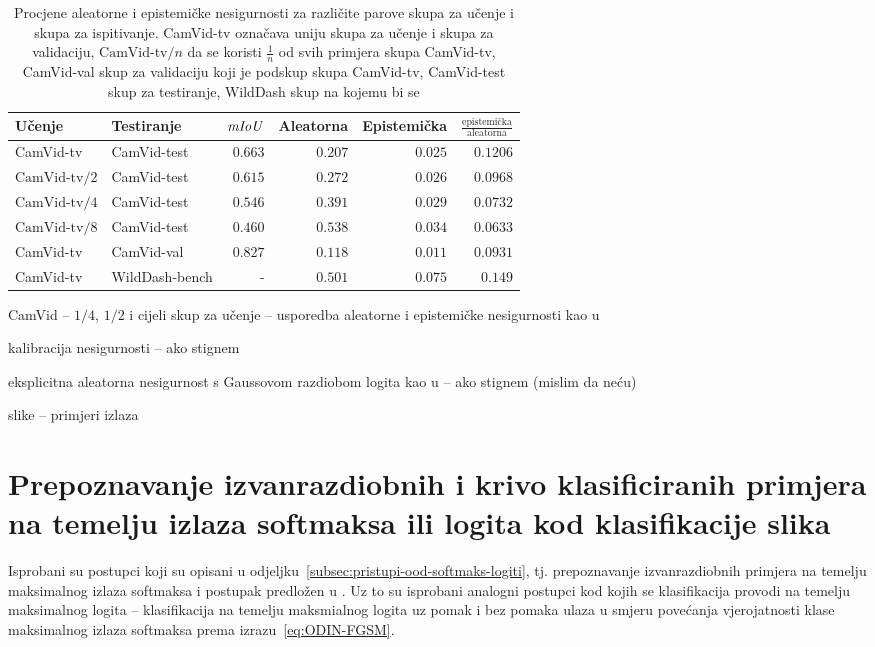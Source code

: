 \documentclass[utf8, diplomski, lmodern]{fer}
\begin{document}
\begin{table}
	\centering\small
	\begin{tabular}{llrrrr}
		\toprule
		\bfseries Učenje & \bfseries Testiranje & $\mathit{mIoU}$ & \bfseries Aleatorna & \bfseries Epistemička & $\frac{\text{epistemička}}{\text{aleatorna}}$ \\
		\midrule
		CamVid-tv & CamVid-test & $0.663$ & $0.207$ & $0.025$ & $0.1206$ \\
		$\text{CamVid-tv}/2$ & CamVid-test & $0.615$ & $0.272$ & $0.026$ & $0.0968$ \\
		$\text{CamVid-tv}/4$ & CamVid-test & $0.546$ & $0.391$ & $0.029$ & $0.0732$ \\
		$\text{CamVid-tv}/8$ & CamVid-test & $0.460$ & $0.538$ & $0.034$ & $0.0633$ \\
		\midrule
		CamVid-tv     & CamVid-val  & $0.827$ & $0.118$ & $0.011$ & $0.0931$ \\
		\midrule
		CamVid-tv    & WildDash-bench &      -  & $0.501$ & $0.075$ & $0.149$ \\
		\bottomrule
	\end{tabular}
	\caption{Procjene aleatorne i epistemičke nesigurnosti za različite parove skupa za učenje i skupa za ispitivanje. CamVid-tv označava uniju skupa za učenje i skupa za validaciju, $\text{CamVid-tv}/n$ da se koristi $\frac{1}{n}$ od svih primjera skupa CamVid-tv, CamVid-val skup za validaciju koji je podskup skupa CamVid-tv, CamVid-test skup za testiranje, WildDash skup na kojemu bi se}
	\label{tab:epistemicka-aleatorna-ucenje-testiranje}
\end{table}


CamVid -- $1/4$, $1/2$ i cijeli skup za učenje -- usporedba aleatorne i epistemičke nesigurnosti kao u \cite{Smith:2018:UMUAED}

kalibracija nesigurnosti -- ako stignem

eksplicitna aleatorna nesigurnost s Gaussovom razdiobom logita kao u \cite{Kendall:2017:WUNBDLCV} -- ako stignem (mislim da neću)

slike -- primjeri izlaza

\section{Prepoznavanje izvanrazdiobnih i krivo klasificiranih primjera na temelju izlaza softmaksa ili logita kod klasifikacije slika}

Isprobani su postupci koji su opisani u odjeljku~\ref{subsec:pristupi-ood-softmaks-logiti}, tj. prepoznavanje izvanrazdiobnih primjera na temelju maksimalnog izlaza softmaksa \citep{Hendrycks:2016:BDMOODE} i postupak predložen u \cite{Liang:2017:PDOODENN}. Uz to su isprobani analogni postupci kod kojih se klasifikacija provodi na temelju maksimalnog logita -- klasifikacija na temelju maksmialnog logita uz pomak i bez pomaka ulaza u smjeru povećanja vjerojatnosti klase maksimalnog izlaza softmaksa prema izrazu~\eqref{eq:ODIN-FGSM}.
\end{document}

